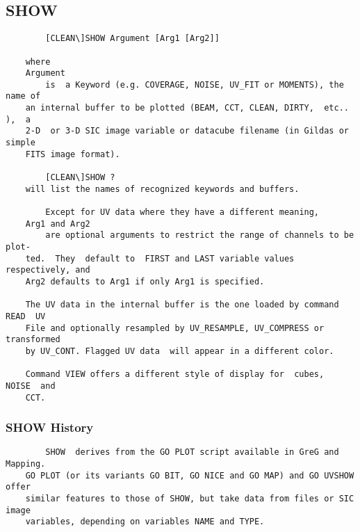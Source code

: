 \subsection{SHOW}
\begin{verbatim}
        [CLEAN\]SHOW Argument [Arg1 [Arg2]]

    where
    Argument
        is  a Keyword (e.g. COVERAGE, NOISE, UV_FIT or MOMENTS), the name of
    an internal buffer to be plotted (BEAM, CCT, CLEAN, DIRTY,  etc..  ),  a
    2-D  or 3-D SIC image variable or datacube filename (in Gildas or simple
    FITS image format).

        [CLEAN\]SHOW ?
    will list the names of recognized keywords and buffers.

        Except for UV data where they have a different meaning,
    Arg1 and Arg2
        are optional arguments to restrict the range of channels to be plot-
    ted.  They  default to  FIRST and LAST variable values respectively, and
    Arg2 defaults to Arg1 if only Arg1 is specified.

    The UV data in the internal buffer is the one loaded by command READ  UV
    File and optionally resampled by UV_RESAMPLE, UV_COMPRESS or transformed
    by UV_CONT. Flagged UV data  will appear in a different color.

    Command VIEW offers a different style of display for  cubes,  NOISE  and
    CCT.

\end{verbatim}
\subsubsection{SHOW History}
\begin{verbatim}
        SHOW  derives from the GO PLOT script available in GreG and Mapping.
    GO PLOT (or its variants GO BIT, GO NICE and GO MAP) and GO UVSHOW offer
    similar features to those of SHOW, but take data from files or SIC image
    variables, depending on variables NAME and TYPE.

\end{verbatim}
